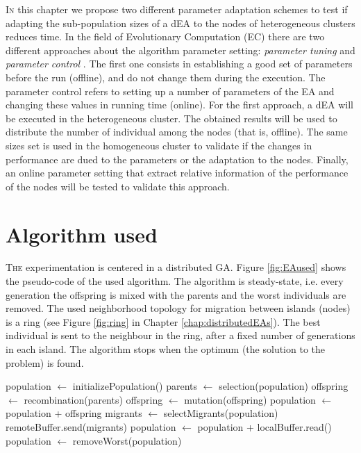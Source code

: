 \label{chap:adaptive}
\minitoc\mtcskip
\vfill
\lettrine{I}{n} this chapter we propose two different parameter adaptation schemes to test if adapting the sub-population sizes of a dEA to the nodes of heterogeneous clusters reduces time. In the field of  Evolutionary Computation (EC) there are two different approaches about the algorithm parameter setting: {\em parameter tuning} and {\em parameter control} \cite{Eiben12Parameters}. The first one consists in establishing a good set of parameters before the run (offline), and do not change them during the execution. The parameter control refers to setting up a number of parameters of the EA  and changing these values in running time (online). For the first approach, a dEA will be executed in the heterogeneous cluster. The obtained results will be used to distribute the number of individual among the nodes (that is, offline). The same sizes set is used in the homogeneous cluster to validate if the changes in performance are dued to the parameters or the adaptation to the nodes. Finally, an online parameter setting that extract relative information of the performance of the nodes will be tested to validate this approach.




\section{Algorithm used}
\lettrine{T}{he} experimentation is centered in a distributed GA. Figure \ref{fig:EAused} shows the pseudo-code of the used algorithm. 
The algorithm is steady-state, i.e. every generation the offspring is mixed with the parents and the worst individuals are removed. The used neighborhood topology for migration between islands (nodes) is a ring (see Figure \ref{fig:ring} in Chapter \ref{chap:distributedEAs}). The best individual is sent to the neighbour in the ring, after a fixed number of generations in each island. The algorithm stops when the optimum (the solution to the problem) is found.  

\newsavebox{\algoadaptativebox}
\begin{lrbox}{\algoadaptativebox}
\begin{minipage}{10cm}
\begin{algorithmic}
\STATE population $\gets$ initializePopulation()
    \STATE parents $\gets$ selection(population)
    \STATE offspring $\gets$ recombination(parents)
    \STATE offspring $\gets$ mutation(offspring)
    \STATE population $\gets$ population + offspring
      \STATE migrants $\gets$ selectMigrants(population)
      \STATE remoteBuffer.send(migrants)
    \ENDIF
      \STATE population $\gets$ population + localBuffer.read()
    \ENDIF
    \STATE population $\gets$ removeWorst(population)
\ENDWHILE
\end{algorithmic}
\end{minipage}
\end{lrbox}

